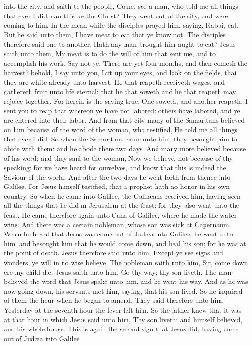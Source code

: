 into the city, and saith to the people, Come, see a man, who told me all things that ever I did: can this be the Christ? They went out of the city, and were coming to him. In the mean while the disciples prayed him, saying, Rabbi, eat. But he said unto them, I have meat to eat that ye know not. The disciples therefore said one to another, Hath any man brought him aught to eat? Jesus saith unto them, My meat is to do the will of him that sent me, and to accomplish his work. Say not ye, There are yet four months, and then cometh the harvest? behold, I say unto you, Lift up your eyes, and look on the fields, that they are white already unto harvest. He that reapeth receiveth wages, and gathereth fruit unto life eternal; that he that soweth and he that reapeth may rejoice together. For herein is the saying true, One soweth, and another reapeth. I sent you to reap that whereon ye have not labored: others have labored, and ye are entered into their labor.  And from that city many of the Samaritans believed on him because of the word of the woman, who testified, He told me all things that ever I did. So when the Samaritans came unto him, they besought him to abide with them: and he abode there two days. And many more believed because of his word; and they said to the woman, Now we believe, not because of thy speaking: for we have heard for ourselves, and know that this is indeed the Saviour of the world.  And after the two days he went forth from thence into Galilee. For Jesus himself testified, that a prophet hath no honor in his own country. So when he came into Galilee, the Galilæans received him, having seen all the things that he did in Jerusalem at the feast: for they also went unto the feast.  He came therefore again unto Cana of Galilee, where he made the water wine. And there was a certain nobleman, whose son was sick at Capernaum. When he heard that Jesus was come out of Judæa into Galilee, he went unto him, and besought him that he would come down, and heal his son; for he was at the point of death. Jesus therefore said unto him, Except ye see signs and wonders, ye will in no wise believe. The nobleman saith unto him, Sir, come down ere my child die. Jesus saith unto him, Go thy way; thy son liveth. The man believed the word that Jesus spake unto him, and he went his way. And as he was now going down, his servants met him, saying, that his son lived. So he inquired of them the hour when he began to amend. They said therefore unto him, Yesterday at the seventh hour the fever left him. So the father knew that it was at that hour in which Jesus said unto him, Thy son liveth: and himself believed, and his whole house. This is again the second sign that Jesus did, having come out of Judæa into Galilee. 



